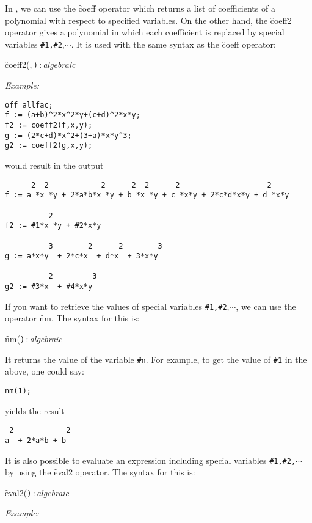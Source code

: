 In \REDUCE,  we can use the \f{coeff} operator which returns a list of coefficients of a polynomial
with respect to  specified variables. 
On the other hand, the \hypertarget{operator:COEFF2}{}\f{coeff2} operator gives a polynomial in which each coefficient is replaced by
special variables \verb|#1,#2|,$\cdots$. It is used with the same syntax as the \f{coeff} operator:
\begin{syntax}
  \f{coeff2(},\,\texttt{)}\,:\,\textit{algebraic}
\end{syntax}
\textit{Example:}
\begin{verbatim}
off allfac;
f := (a+b)^2*x^2*y+(c+d)^2*x*y;
f2 := coeff2(f,x,y);
g := (2*c+d)*x^2+(3+a)*x*y^3;
g2 := coeff2(g,x,y);
\end{verbatim}
would result in the output
\begin{verbatim}
      2  2            2      2  2      2                    2
f := a *x *y + 2*a*b*x *y + b *x *y + c *x*y + 2*c*d*x*y + d *x*y

          2
f2 := #1*x *y + #2*x*y

          3        2      2        3
g := a*x*y  + 2*c*x  + d*x  + 3*x*y

          2         3
g2 := #3*x  + #4*x*y
\end{verbatim}
If you want to retrieve the values of  special variables \verb|#1,#2|,$\cdots$,
we can use the operator \hypertarget{operator:NM}{}\f{nm}. The syntax for this is:
\begin{syntax}
  \f{nm(}\texttt{)}\,:\,\textit{algebraic}
\end{syntax}
It returns the value of the variable \verb|#n|. For example, to get the value of 
\verb|#1| in the above, one could say:
\begin{verbatim}
nm(1);
\end{verbatim}
yields the result
\begin{verbatim}
 2            2
a  + 2*a*b + b
\end{verbatim}
It is also possible to evaluate an expression including  special variables \verb|#1,#2,|$\cdots$
by using the \hypertarget{operator:EVAL2}{}\f{eval2} operator.
The syntax for this is:
\begin{syntax}
  \f{eval2(}\texttt{)}\,:\,\textit{algebraic}
\end{syntax}
\textit{Example:}
